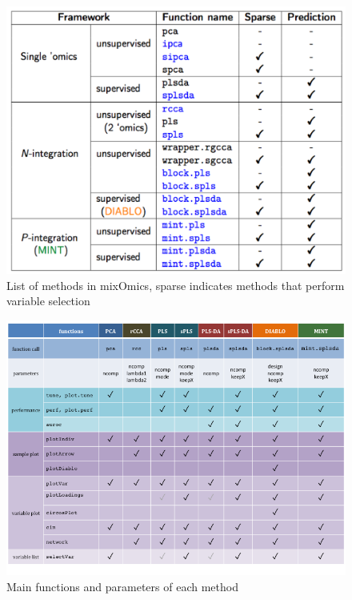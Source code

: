 \documentclass[]{book}
\begin{document}
\begin{figure}[h]

{\centering \includegraphics[width=1\linewidth,]{XtraFigs/Methods} 

}

\caption{List of methods in mixOmics, sparse indicates methods that perform variable selection}\label{fig:01-methods}
\end{figure}

\begin{figure}[h]

{\centering \includegraphics[width=1\linewidth,]{XtraFigs/cheatsheet} 

}

\caption{Main functions and parameters of each method}\label{fig:01-cheatsheet}
\end{figure}
\end{document}
